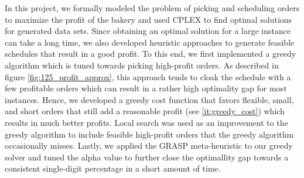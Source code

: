 \documentclass{article}
\begin{document}
In this project, we formally modeled the problem of picking and scheduling orders to maximize the profit of the bakery and used CPLEX to find optimal solutions for generated data sets.
Since obtaining an optimal solution for a large instance can take a long time, we also developed heuristic approaches to generate feasible schedules that result in a good profit. To this end, we first implemented a greedy algorithm which is tuned towards picking high-profit orders. As described in figure \ref{fig:125_profit_approx}, this approach tends to cloak the schedule with a few profitable orders which can result in a rather high optimality gap for most instances. Hence, we developed a greedy cost function that favors flexible, small, and short orders that still add a reasonable profit (see \ref{it:greedy_cost}) which results in much better profits. Local search was used as an improvement to the greedy algorithm to include feasible high-profit orders that the greedy algorithm occasionally misses. Lastly, we applied the GRASP meta-heuristic to our greedy solver and tuned the alpha value to further close the optimallity gap towards a consistent single-digit percentage in a short amount of time. 
\end{document}
